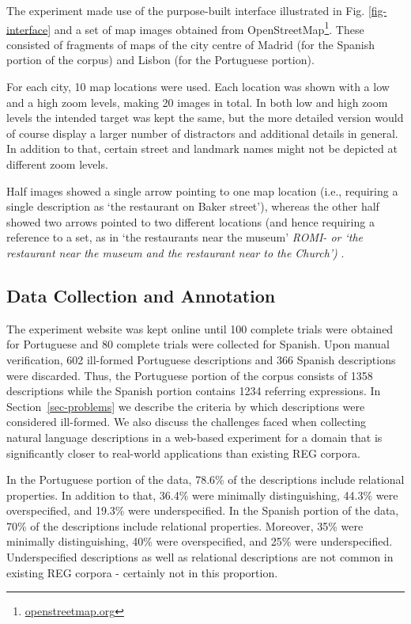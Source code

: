 \documentclass{article}
\begin{document}
The experiment made use of the purpose-built interface illustrated in Fig. \ref{fig-interface} and a set of map images obtained from OpenStreetMap\footnote{\url{openstreetmap.org}}. These consisted of fragments of maps of the city centre of Madrid (for the Spanish portion of the corpus) and Lisbon (for the Portuguese portion). 

For each city, 10 map locations were used. Each location was shown with a low and a high zoom levels, making 20 images in total. In both low and high zoom levels  the intended target was kept the same, but the more detailed version would of course display a larger number of distractors and additional details in general. In addition to that, certain street and landmark names might not be depicted at different zoom levels.

Half images showed a single arrow pointing to one map location (i.e., requiring a single description as `the restaurant on Baker street'), whereas the other half showed two arrows pointed to two different locations (and hence requiring a reference to a set, as in `the restaurants near the museum'
{\it ROMI- or `the restaurant near the museum and the restaurant near to the Church') }. 


\subsection{Data Collection and Annotation}
\label{sec-annotation}

The experiment website was kept online until 100 complete trials were obtained for Portuguese and 80 complete trials were collected for Spanish. Upon manual verification, 602 ill-formed Portuguese descriptions and 366 Spanish descriptions were discarded. Thus, the Portuguese portion of the corpus consists of 1358 descriptions while the Spanish portion contains 1234 referring expressions. In Section~\ref{sec-problems} we describe the criteria by which descriptions were considered ill-formed. We also discuss the challenges faced when collecting natural language descriptions in a web-based experiment for a domain that is significantly closer to real-world applications than existing REG corpora. 

In the Portuguese portion of the data, 78.6\% of the descriptions include relational properties. In addition to that, 36.4\% were minimally distinguishing, 44.3\% were overspecified, and  19.3\% were underspecified. In the Spanish portion of the data, 70\% of the descriptions include relational properties. Moreover, 35\% were minimally distinguishing, 40\% were overspecified, and 25\% were underspecified. Underspecified descriptions as well as relational descriptions are not common in existing REG corpora - certainly not in this proportion.  
\end{document}
